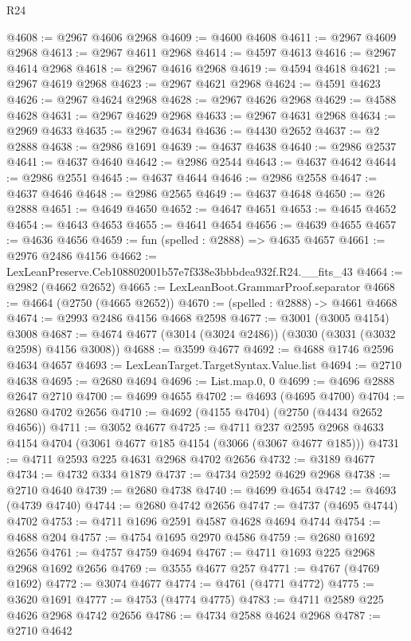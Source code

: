\begin{lexlean}{R24}
\begin{coremodule}
@4608 := @2967 @4606 @2968
@4609 := @4600 @4608
@4611 := @2967 @4609 @2968
@4613 := @2967 @4611 @2968
@4614 := @4597 @4613
@4616 := @2967 @4614 @2968
@4618 := @2967 @4616 @2968
@4619 := @4594 @4618
@4621 := @2967 @4619 @2968
@4623 := @2967 @4621 @2968
@4624 := @4591 @4623
@4626 := @2967 @4624 @2968
@4628 := @2967 @4626 @2968
@4629 := @4588 @4628
@4631 := @2967 @4629 @2968
@4633 := @2967 @4631 @2968
@4634 := @2969 @4633
@4635 := @2967 @4634
@4636 := @4430 @2652
@4637 := @2 @2888
@4638 := @2986 @1691
@4639 := @4637 @4638
@4640 := @2986 @2537
@4641 := @4637 @4640
@4642 := @2986 @2544
@4643 := @4637 @4642
@4644 := @2986 @2551
@4645 := @4637 @4644
@4646 := @2986 @2558
@4647 := @4637 @4646
@4648 := @2986 @2565
@4649 := @4637 @4648
@4650 := @26 @2888
@4651 := @4649 @4650
@4652 := @4647 @4651
@4653 := @4645 @4652
@4654 := @4643 @4653
@4655 := @4641 @4654
@4656 := @4639 @4655
@4657 := @4636 @4656
@4659 := fun (spelled : @2888) => @4635 @4657
@4661 := @2976 @2486 @4156
@4662 := LexLeanPreserve.Ceb108802001b57e7f338e3bbbdea932f.R24.__fits_43
@4664 := @2982 (@4662 @2652)
@4665 := LexLeanBoot.GrammarProof.separator
@4668 := @4664 (@2750 (@4665 @2652))
@4670 := (spelled : @2888) -> @4661 @4668
@4674 := @2993 @2486 @4156 @4668 @2598
@4677 := @3001 (@3005 @4154) @3008
@4687 := @4674 @4677 (@3014 (@3024 @2486)) (@3030 (@3031 (@3032 @2598) @4156 @3008))
@4688 := @3599 @4677
@4692 := @4688 @1746 @2596 @4634 @4657
@4693 := LexLeanTarget.TargetSyntax.Value.list
@4694 := @2710 @4638
@4695 := @2680 @4694
@4696 := List.map.{0, 0}
@4699 := @4696 @2888 @2647 @2710
@4700 := @4699 @4655
@4702 := @4693 (@4695 @4700)
@4704 := @2680 @4702 @2656
@4710 := @4692 (@4155 @4704) (@2750 (@4434 @2652 @4656))
@4711 := @3052 @4677
@4725 := @4711
    @237
    @2595
    @2968
    @4633
    @4154
    @4704
    (@3061 @4677 @185 @4154 (@3066 (@3067 @4677 @185)))
@4731 := @4711 @2593 @225 @4631 @2968 @4702 @2656
@4732 := @3189 @4677
@4734 := @4732 @334 @1879
@4737 := @4734 @2592 @4629 @2968
@4738 := @2710 @4640
@4739 := @2680 @4738
@4740 := @4699 @4654
@4742 := @4693 (@4739 @4740)
@4744 := @2680 @4742 @2656
@4747 := @4737 (@4695 @4744) @4702
@4753 := @4711 @1696 @2591 @4587 @4628 @4694 @4744
@4754 := @4688 @204
@4757 := @4754 @1695 @2970 @4586
@4759 := @2680 @1692 @2656
@4761 := @4757 @4759 @4694
@4767 := @4711 @1693 @225 @2968 @2968 @1692 @2656
@4769 := @3555 @4677 @257
@4771 := @4767 (@4769 @1692)
@4772 := @3074 @4677
@4774 := @4761 (@4771 @4772)
@4775 := @3620 @1691
@4777 := @4753 (@4774 @4775)
@4783 := @4711 @2589 @225 @4626 @2968 @4742 @2656
@4786 := @4734 @2588 @4624 @2968
@4787 := @2710 @4642

\end{coremodule}
\end{lexlean}
